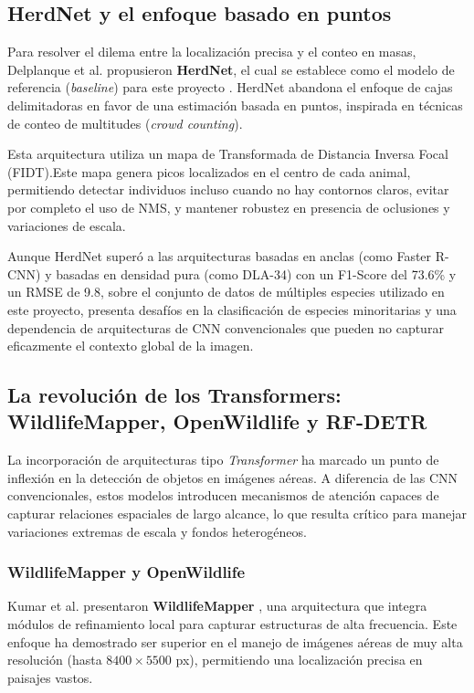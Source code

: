 \subsection{HerdNet y el enfoque basado en puntos}

Para resolver el dilema entre la localización precisa y el conteo en masas, Delplanque et al. propusieron \textbf{HerdNet}, el cual se establece como el modelo de referencia (\textit{baseline}) para este proyecto \cite{herdnet}. HerdNet abandona el enfoque de cajas delimitadoras en favor de una estimación basada en puntos, inspirada en técnicas de conteo de multitudes (\textit{crowd counting}).

Esta arquitectura utiliza un mapa de Transformada de Distancia Inversa Focal (FIDT).Este mapa genera picos localizados en el centro de cada animal, permitiendo detectar individuos incluso cuando no hay contornos claros, evitar por completo el uso de NMS, y mantener robustez en presencia de oclusiones y variaciones de escala.

Aunque HerdNet superó a las arquitecturas basadas en anclas (como Faster R-CNN) y basadas en densidad pura (como DLA-34) con un F1-Score del 73.6\% y un RMSE de 9.8, sobre el conjunto de datos de múltiples especies utilizado en este proyecto, presenta desafíos en la clasificación de especies minoritarias y una dependencia de arquitecturas de CNN convencionales que pueden no capturar eficazmente el contexto global de la imagen.

\subsection{La revolución de los Transformers: WildlifeMapper, OpenWildlife y RF-DETR}

La incorporación de arquitecturas tipo \textit{Transformer} ha marcado un punto de inflexión en la detección de objetos en imágenes aéreas. A diferencia de las CNN convencionales, estos modelos introducen mecanismos de atención capaces de capturar relaciones espaciales de largo alcance, lo que resulta crítico para manejar variaciones extremas de escala y fondos heterogéneos.

\subsubsection*{WildlifeMapper y OpenWildlife}
Kumar et al. presentaron \textbf{WildlifeMapper} \cite{wildlife-mapper}, una arquitectura que integra módulos de refinamiento local para capturar estructuras de alta frecuencia. Este enfoque ha demostrado ser superior en el manejo de imágenes aéreas de muy alta resolución (hasta $8400 \times 5500$ px), permitiendo una localización precisa en paisajes vastos.

